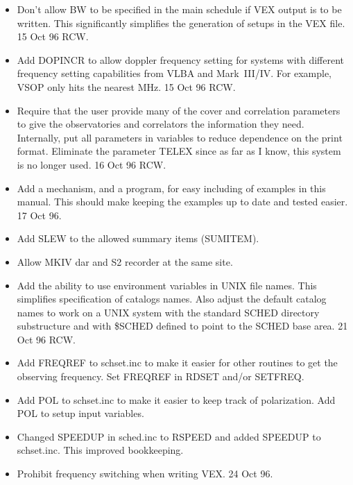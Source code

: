 \documentclass{report}
\begin{document}
\begin{itemize}
\item Don't allow BW to be specified in the main schedule if VEX
      output is to be written.  This significantly simplifies the
      generation of setups in the VEX file.  15 Oct 96 RCW.

\item Add DOPINCR to allow doppler frequency setting for systems
      with different frequency setting capabilities from VLBA and
      Mark~III/IV.  For example, VSOP only hits the nearest MHz.
      15 Oct 96 RCW.

\item Require that the user provide many of the cover and correlation
      parameters to give the observatories and correlators the
      information they need.   Internally, put all
      parameters in variables to reduce dependence on the print format.
      Eliminate the parameter TELEX since as far as I know, this
      system is no longer used.  16 Oct 96  RCW.

\item Add a mechanism, and a program, for easy including of examples
      in this manual.  This should make keeping the examples up to
      date and tested easier.  17 Oct 96.

\item Add SLEW to the allowed summary items (SUMITEM).

\item Allow MKIV dar and S2 recorder at the same site.

\item Add the ability to use environment variables in UNIX file names.
      This simplifies specification of catalogs names.  Also adjust
      the default catalog names to work on a UNIX system with the
      standard SCHED directory substructure and with \$SCHED defined
      to point to the SCHED base area.   21 Oct 96  RCW.

\item Add FREQREF to schset.inc to make it easier for other routines
      to get the observing frequency.  Set FREQREF in RDSET and/or
      SETFREQ.

\item Add POL to schset.inc to make it easier to keep track of
      polarization.  Add POL to setup input variables.

\item Changed SPEEDUP in sched.inc to RSPEED and added SPEEDUP to
      schset.inc.  This improved bookkeeping.

\item Prohibit frequency switching when writing VEX.  24 Oct 96.


\end{itemize}
\end{document}
